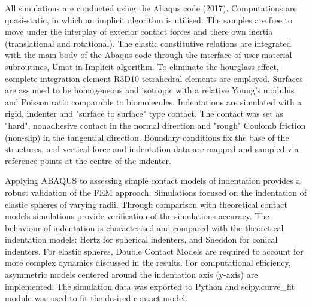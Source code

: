 All simulations are conducted using the Abaqus code (2017). Computations are quasi-static, in which an implicit algorithm is utilised. The samples are free to move under the interplay of exterior contact forces and there own inertia (translational and rotational). The elastic constitutive relations are integrated with the main body of the Abaqus code through the interface of user material subroutines, Umat in Implicit algorithm. To eliminate the hourglass effect, complete integration element R3D10 tetrahedral elements are employed. Surfaces are assumed to be homogeneous and isotropic with a relative Young's modulus and Poisson ratio comparable to biomolecules. Indentations are simulated with a rigid, indenter and "surface to surface" type contact. The contact was set as "hard", nonadhesive contact in the normal direction and "rough" Coulomb friction (non-slip) in the tangential direction. Boundary conditions fix the base of the structures, and vertical force and indentation data are mapped and sampled via reference points at the centre of the indenter.

Applying ABAQUS to assessing simple contact models of indentation provides a robust validation of the FEM approach. Simulations focused on the indentation of elastic spheres of varying radii. Through comparison with theoretical contact models simulations provide verification of the simulations accuracy. The behaviour of indentation is characterised and compared with the theoretical indentation models: Hertz\cite{kontomaris2018hertz} for spherical indenters, and Sneddon\cite{han2021modified} for conical indenters. For elastic spheres, Double Contact Models\cite{dokukin2013quantitative,glaubitz2014novel} are required to account for more complex dynamics discussed in the results. For computational efficiency, asymmetric models centered around the indentation axis (y-axis) are implemented. The simulation data was exported to Python and scipy.curve\_fit module was used to fit the desired contact model.


